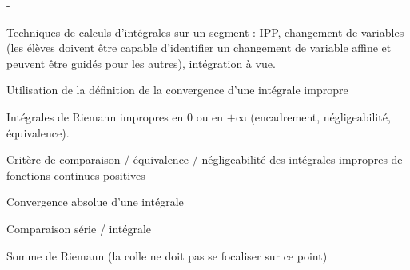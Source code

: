 \documentclass[11pt]{article}%
\begin{document}
\begin{noliste}{-}
 \item Techniques de calculs d'intégrales sur un segment : IPP, 
 changement de variables (les élèves doivent être capable d'identifier 
 un changement de variable affine et peuvent être guidés pour les 
 autres), intégration à vue.
 \item Utilisation de la définition de la convergence d'une intégrale 
 impropre
 \item Intégrales de Riemann impropres en $0$ ou en $+\infty$ 
 (encadrement, négligeabilité, équivalence).
 \item Critère de comparaison / équivalence / négligeabilité des 
 intégrales impropres de fonctions continues positives
 \item Convergence absolue d'une intégrale
 \item Comparaison série / intégrale
 \item Somme de Riemann (la colle ne doit pas se focaliser sur ce point)
\end{noliste}
\end{document}
